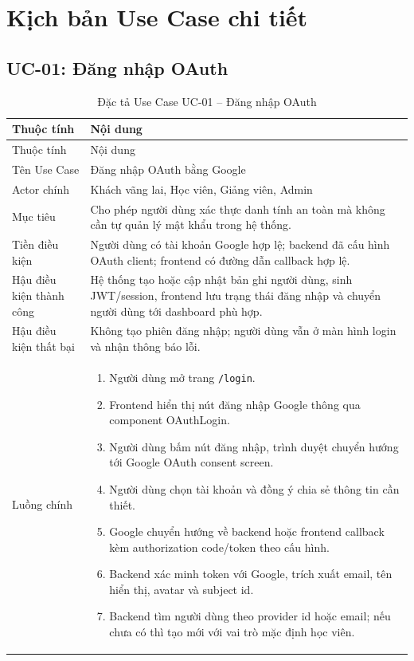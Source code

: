 \documentclass[12pt,a4paper]{report}
\begin{document}
\chapter{Kịch bản Use Case chi tiết}

\section{UC-01: Đăng nhập OAuth}
\begin{longtable}{L{4cm} L{10.5cm}}
\caption{Đặc tả Use Case UC-01 -- Đăng nhập OAuth}\label{tab:uc-login}\\
\toprule
Thuộc tính & Nội dung \\
\midrule
\endfirsthead
\toprule
Thuộc tính & Nội dung \\
\midrule
\endhead
Tên Use Case & Đăng nhập OAuth bằng Google \\
Actor chính & Khách vãng lai, Học viên, Giảng viên, Admin \\
Mục tiêu & Cho phép người dùng xác thực danh tính an toàn mà không cần tự quản lý mật khẩu trong hệ thống. \\
Tiền điều kiện & Người dùng có tài khoản Google hợp lệ; backend đã cấu hình OAuth client; frontend có đường dẫn callback hợp lệ. \\
Hậu điều kiện thành công & Hệ thống tạo hoặc cập nhật bản ghi người dùng, sinh JWT/session, frontend lưu trạng thái đăng nhập và chuyển người dùng tới dashboard phù hợp. \\
Hậu điều kiện thất bại & Không tạo phiên đăng nhập; người dùng vẫn ở màn hình login và nhận thông báo lỗi. \\
Luồng chính & \begin{enumerate}[leftmargin=*]
\item Người dùng mở trang \texttt{/login}.
\item Frontend hiển thị nút đăng nhập Google thông qua component OAuthLogin.
\item Người dùng bấm nút đăng nhập, trình duyệt chuyển hướng tới Google OAuth consent screen.
\item Người dùng chọn tài khoản và đồng ý chia sẻ thông tin cần thiết.
\item Google chuyển hướng về backend hoặc frontend callback kèm authorization code/token theo cấu hình.
\item Backend xác minh token với Google, trích xuất email, tên hiển thị, avatar và subject id.
\item Backend tìm người dùng theo provider id hoặc email; nếu chưa có thì tạo mới với vai trò mặc định học viên.

\end{enumerate}
\end{longtable}
\end{document}
